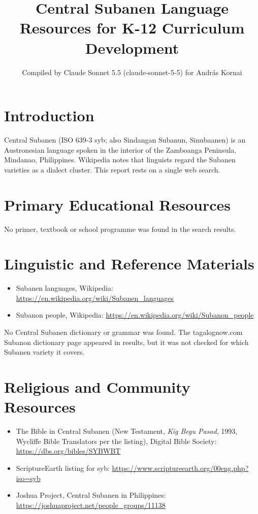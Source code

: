 \documentclass[12pt]{article}
\title{Central Subanen Language Resources for K-12 Curriculum Development}
\author{Compiled by Claude Sonnet 5.5 (claude-sonnet-5-5) for Andr\'as Kornai}
\date{}
\begin{document}
\maketitle

\section{Introduction}
Central Subanen (ISO 639-3 syb; also Sindangan Subanun, Sinubaanen) is an Austronesian language spoken in the interior of the Zamboanga Peninsula, Mindanao, Philippines. Wikipedia notes that linguists regard the Subanen varieties as a dialect cluster. This report rests on a single web search.

\section{Primary Educational Resources}
No primer, textbook or school programme was found in the search results.

\section{Linguistic and Reference Materials}
\begin{itemize}
\item Subanen languages, Wikipedia: \url{https://en.wikipedia.org/wiki/Subanen_languages}
\item Subanon people, Wikipedia: \url{https://en.wikipedia.org/wiki/Subanon_people}
\end{itemize}
No Central Subanen dictionary or grammar was found. The tagalognow.com Subanon dictionary page appeared in results, but it was not checked for which Subanen variety it covers.

\section{Religious and Community Resources}
\begin{itemize}
\item The Bible in Central Subanen (New Testament, \emph{Kig Begu Pasad}, 1993, Wycliffe Bible Translators per the listing), Digital Bible Society: \url{https://dbs.org/bibles/SYBWBT}
\item ScriptureEarth listing for syb: \url{https://www.scriptureearth.org/00eng.php?iso=syb}
\item Joshua Project, Central Subanen in Philippines: \url{https://joshuaproject.net/people_groups/11138}
\end{itemize}
\end{document}
